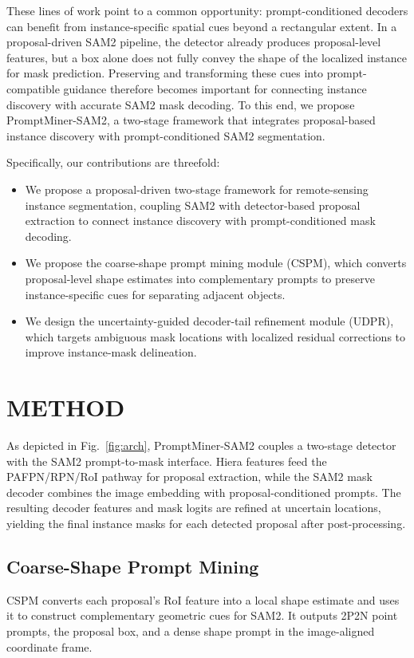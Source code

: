 \documentclass{article}
\begin{document}
These lines of work point to a common opportunity: prompt-conditioned decoders can benefit from instance-specific spatial cues beyond a rectangular extent. In a proposal-driven SAM2 pipeline, the detector already produces proposal-level features, but a box alone does not fully convey the shape of the localized instance for mask prediction. Preserving and transforming these cues into prompt-compatible guidance therefore becomes important for connecting instance discovery with accurate SAM2 mask decoding. To this end, we propose PromptMiner-SAM2, a two-stage framework that integrates proposal-based instance discovery with prompt-conditioned SAM2 segmentation.

Specifically, our contributions are threefold:
\begin{itemize}
  \item We propose a proposal-driven two-stage framework for remote-sensing
  instance segmentation, coupling SAM2 with detector-based proposal extraction
  to connect instance discovery with prompt-conditioned mask decoding.
  \item We propose the coarse-shape prompt mining module (CSPM), which converts
  proposal-level shape estimates into complementary prompts to preserve
  instance-specific cues for separating adjacent objects.
  \item We design the uncertainty-guided decoder-tail refinement module (UDPR),
  which targets ambiguous mask locations with localized residual corrections to
  improve instance-mask delineation.
\end{itemize}

\section{METHOD}
As depicted in Fig.~\ref{fig:arch}, PromptMiner-SAM2 couples a two-stage
detector with the SAM2 prompt-to-mask interface. Hiera features feed the
PAFPN/RPN/RoI pathway for proposal extraction, while the SAM2 mask decoder
combines the image embedding with proposal-conditioned prompts. The resulting
decoder features and mask logits are refined at uncertain locations, yielding
the final instance masks for each detected proposal after post-processing.

\subsection{Coarse-Shape Prompt Mining}
CSPM converts each proposal's RoI feature into a local shape estimate and uses it to construct complementary
geometric cues for SAM2. It outputs 2P2N point prompts, the proposal box, and a
dense shape prompt in the image-aligned coordinate frame.
\end{document}
